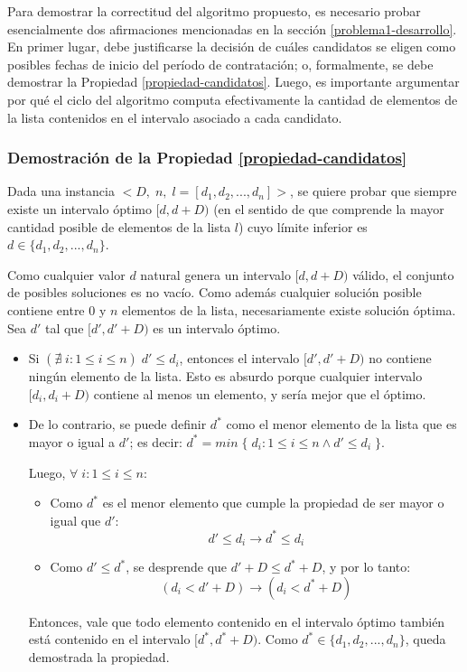 Para demostrar la correctitud del algoritmo propuesto, es necesario probar esencialmente dos afirmaciones mencionadas en la sección \ref{problema1-desarrollo}. En primer lugar, debe justificarse la decisión de cuáles candidatos se eligen como posibles fechas de inicio del período de contratación; o, formalmente, se debe demostrar la Propiedad \ref{propiedad-candidatos}. Luego, es importante argumentar por qué el ciclo del algoritmo computa efectivamente la cantidad de elementos de la lista contenidos en el intervalo asociado a cada candidato.

\subsubsection{Demostración de la Propiedad \ref{propiedad-candidatos}}

Dada una instancia $<D,\;n,\;l = [d_1, d_2, ..., d_n]>$, se quiere probar que siempre existe un intervalo óptimo $[d, d + D)$ (en el sentido de que comprende la mayor cantidad posible de elementos de la lista $l$) cuyo límite inferior es $d \in \{d_1,d_2,...,d_n\}$.

Como cualquier valor $d$ natural genera un intervalo $[d, d + D)$ válido, el conjunto de posibles soluciones es no vacío. Como además cualquier solución posible contiene entre 0 y $n$ elementos de la lista, necesariamente existe solución óptima. Sea $d'$ tal que $[d', d' + D)$ es un intervalo óptimo.

\begin{itemize}
  \item Si $(\nexists\;i : 1 \leq i \leq n)\;d' \leq d_i$, entonces el intervalo $[d', d' + D)$ no contiene ningún elemento de la lista. Esto es absurdo porque cualquier intervalo $[d_i, d_i + D)$ contiene al menos un elemento, y sería mejor que el óptimo.
  \item De lo contrario, se puede definir $d^*$ como el menor elemento de la lista que es mayor o igual a $d'$; es decir: $d^* = min\;\{\;d_i : 1 \leq i \leq n \land d' \leq d_i\;\}$.

  Luego, $\forall\;i : 1 \leq i \leq n$:
  
  \begin{itemize}
    \item Como $d^*$ es el menor elemento que cumple la propiedad de ser mayor o igual que $d'$:
    $$d' \leq d_i \rightarrow d^*\leq d_i$$
    \item Como $d' \leq d^*$, se desprende que $d' + D \leq d^* + D$, y por lo tanto:
    $$(d_i < d' + D) \rightarrow (d_i < d^* + D)$$
  \end{itemize}
  Entonces, vale que todo elemento contenido en el intervalo óptimo también está contenido en el intervalo $[d^*, d^* + D)$. Como $d^* \in \{d_1,d_2,...,d_n\}$, queda demostrada la propiedad.
\end{itemize}

